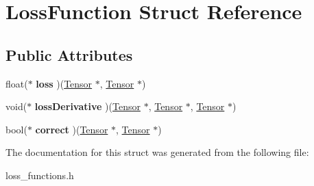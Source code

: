\hypertarget{structLossFunction}{}\section{Loss\+Function Struct Reference}
\label{structLossFunction}
\subsection*{Public Attributes}
\begin{DoxyCompactItemize}
\item 
float($\ast$ {\bfseries loss} )(\hyperlink{structTensor}{Tensor} $\ast$, \hyperlink{structTensor}{Tensor} $\ast$)\hypertarget{structLossFunction_ac9674bcf59bf0721d777958fdd727928}{}\label{structLossFunction_ac9674bcf59bf0721d777958fdd727928}

\item 
void($\ast$ {\bfseries loss\+Derivative} )(\hyperlink{structTensor}{Tensor} $\ast$, \hyperlink{structTensor}{Tensor} $\ast$, \hyperlink{structTensor}{Tensor} $\ast$)\hypertarget{structLossFunction_adaa799b91da3c341091e6f57a1f10ded}{}\label{structLossFunction_adaa799b91da3c341091e6f57a1f10ded}

\item 
bool($\ast$ {\bfseries correct} )(\hyperlink{structTensor}{Tensor} $\ast$, \hyperlink{structTensor}{Tensor} $\ast$)\hypertarget{structLossFunction_a561e98d47acdeb0f07316ea47cc8b576}{}\label{structLossFunction_a561e98d47acdeb0f07316ea47cc8b576}

\end{DoxyCompactItemize}


The documentation for this struct was generated from the following file\+:\begin{DoxyCompactItemize}
\item 
loss\+\_\+functions.\+h\end{DoxyCompactItemize}
